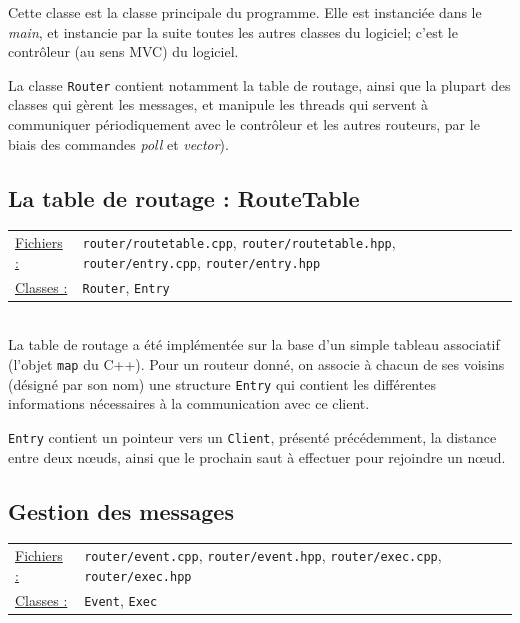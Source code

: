 \documentclass[a4paper,11pt]{article}
\begin{document}
Cette classe est la classe principale du programme. Elle est instanciée dans le \textit{main}, et instancie par la suite toutes les autres
classes du logiciel; c'est le contrôleur (au sens MVC) du logiciel.

La classe \texttt{Router} contient notamment la table de routage, ainsi que la plupart des classes qui gèrent les messages, et manipule les threads
qui servent à communiquer périodiquement avec le contrôleur et les autres routeurs, par le biais des commandes \textit{poll} et \textit{vector}).

\subsection{La table de routage : RouteTable}

\begin{tabularx}{\linewidth}{lX}
\underline{Fichiers :} & \texttt{router/routetable.cpp}, \texttt{router/routetable.hpp}, \texttt{router/entry.cpp}, \texttt{router/entry.hpp}\\
\underline{Classes :} & \texttt{Router}, \texttt{Entry}\\
\end{tabularx}\\

La table de routage a été implémentée sur la base d'un simple tableau associatif (l'objet \texttt{map} du C++).
Pour un routeur donné, on associe à chacun de ses voisins (désigné par son nom) une structure \texttt{Entry} qui contient les différentes informations nécessaires
à la communication avec ce client.

\texttt{Entry} contient un pointeur vers un \texttt{Client}, présenté précédemment, la distance entre deux n\oe uds, ainsi que
le prochain saut à effectuer pour rejoindre un n\oe ud.

\subsection{Gestion des messages}

\begin{tabularx}{\linewidth}{lX}
\underline{Fichiers :} & \texttt{router/event.cpp}, \texttt{router/event.hpp}, \texttt{router/exec.cpp}, \texttt{router/exec.hpp}\\
\underline{Classes :} & \texttt{Event}, \texttt{Exec}\\
\end{tabularx}\\
\end{document}
